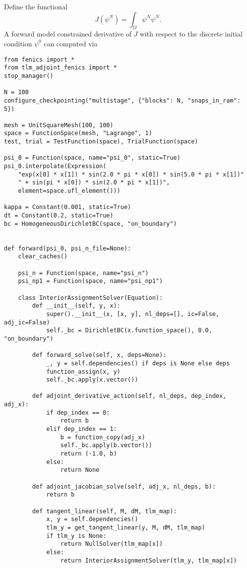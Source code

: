 \documentclass[11pt]{article}
\begin{document}
Define the functional
\begin{equation*}
  J \left( \psi^N \right) = \int_\Omega \psi^N \psi^N.
\end{equation*}
A forward model constrained derivative of $J$ with respect to the discrete
initial condition $\psi^0$ can computed via
\begin{lstlisting}
from fenics import *
from tlm_adjoint_fenics import *
stop_manager()

N = 100
configure_checkpointing("multistage", {"blocks": N, "snaps_in_ram": 5})

mesh = UnitSquareMesh(100, 100)
space = FunctionSpace(mesh, "Lagrange", 1)
test, trial = TestFunction(space), TrialFunction(space)

psi_0 = Function(space, name="psi_0", static=True)
psi_0.interpolate(Expression(
    "exp(x[0] * x[1]) * sin(2.0 * pi * x[0]) * sin(5.0 * pi * x[1])"
    " + sin(pi * x[0]) * sin(2.0 * pi * x[1])",
    element=space.ufl_element()))

kappa = Constant(0.001, static=True)
dt = Constant(0.2, static=True)
bc = HomogeneousDirichletBC(space, "on_boundary")


def forward(psi_0, psi_n_file=None):
    clear_caches()

    psi_n = Function(space, name="psi_n")
    psi_np1 = Function(space, name="psi_np1")

    class InteriorAssignmentSolver(Equation):
        def __init__(self, y, x):
            super().__init__(x, [x, y], nl_deps=[], ic=False, adj_ic=False)
            self._bc = DirichletBC(x.function_space(), 0.0, "on_boundary")

        def forward_solve(self, x, deps=None):
            _, y = self.dependencies() if deps is None else deps
            function_assign(x, y)
            self._bc.apply(x.vector())

        def adjoint_derivative_action(self, nl_deps, dep_index, adj_x):
            if dep_index == 0:
                return b
            elif dep_index == 1:
                b = function_copy(adj_x)
                self._bc.apply(b.vector())
                return (-1.0, b)
            else:
                return None

        def adjoint_jacobian_solve(self, adj_x, nl_deps, b):
            return b

        def tangent_linear(self, M, dM, tlm_map):
            x, y = self.dependencies()
            tlm_y = get_tangent_linear(y, M, dM, tlm_map)
            if tlm_y is None:
                return NullSolver(tlm_map[x])
            else:
                return InteriorAssignmentSolver(tlm_y, tlm_map[x])


\end{lstlisting}
\end{document}
